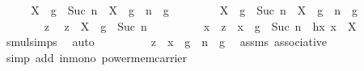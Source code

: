 \begin{isabellebody}
\ \ \isamarkupfalse%
\ \isamarkupfalse%
\ {\isachardoublequoteopen}X\ {\isasymcdots}\ {\isacharbraceleft}{\kern0pt}g\ {\isacharcircum}{\kern0pt}\ Suc\ n{\isacharbraceright}{\kern0pt}\ {\isacharequal}{\kern0pt}\ {\isacharparenleft}{\kern0pt}X\ {\isasymcdots}\ {\isacharbraceleft}{\kern0pt}g\ {\isacharcircum}{\kern0pt}\ n{\isacharbraceright}{\kern0pt}{\isacharparenright}{\kern0pt}\ {\isasymcdots}\ {\isacharbraceleft}{\kern0pt}g{\isacharbraceright}{\kern0pt}{\isachardoublequoteclose}\isanewline
\ \ \isamarkupfalse%
\isanewline
\ \ \ \ \isamarkupfalse%
\ {\isachardoublequoteopen}X\ {\isasymcdots}\ {\isacharbraceleft}{\kern0pt}g\ {\isacharcircum}{\kern0pt}\ Suc\ n{\isacharbraceright}{\kern0pt}\ {\isasymsubseteq}\ {\isacharparenleft}{\kern0pt}X\ {\isasymcdots}\ {\isacharbraceleft}{\kern0pt}g\ {\isacharcircum}{\kern0pt}\ n{\isacharbraceright}{\kern0pt}{\isacharparenright}{\kern0pt}\ {\isasymcdots}\ {\isacharbraceleft}{\kern0pt}g{\isacharbraceright}{\kern0pt}{\isachardoublequoteclose}\isanewline
\ \ \ \ \isamarkupfalse%
\isanewline
\ \ \ \ \ \ \isamarkupfalse%
\ z\ \isamarkupfalse%
\ {\isachardoublequoteopen}z\ {\isasymin}\ X\ {\isasymcdots}\ {\isacharbraceleft}{\kern0pt}g\ {\isacharcircum}{\kern0pt}\ Suc\ n{\isacharbraceright}{\kern0pt}{\isachardoublequoteclose}\isanewline
\ \ \ \ \ \ \isamarkupfalse%
\ \isamarkupfalse%
\ x\ \ {\isachardoublequoteopen}z\ {\isacharequal}{\kern0pt}\ x\ {\isasymcdot}\ {\isacharparenleft}{\kern0pt}g\ {\isacharcircum}{\kern0pt}\ Suc\ n{\isacharparenright}{\kern0pt}{\isachardoublequoteclose}\ \ hx{\isacharcolon}{\kern0pt}\ {\isachardoublequoteopen}x\ {\isasymin}\ X{\isachardoublequoteclose}\ \ \isamarkupfalse%
\ smul{\isachardot}{\kern0pt}simps\ \isamarkupfalse%
\ auto\isanewline
\ \ \ \ \ \ \isamarkupfalse%
\ \isamarkupfalse%
\ {\isachardoublequoteopen}z\ {\isacharequal}{\kern0pt}\ {\isacharparenleft}{\kern0pt}x\ {\isasymcdot}\ g\ {\isacharcircum}{\kern0pt}\ n{\isacharparenright}{\kern0pt}\ {\isasymcdot}\ g{\isachardoublequoteclose}\ \isamarkupfalse%
\ assms\ associative\ \isamarkupfalse%
\ {\isacharparenleft}{\kern0pt}simp\ add{\isacharcolon}{\kern0pt}\ in{\isacharunderscore}{\kern0pt}mono\ power{\isacharunderscore}{\kern0pt}mem{\isacharunderscore}{\kern0pt}carrier{\isacharparenright}{\kern0pt}\ \isanewline
\ \ \ \ \ \ \isamarkupfalse%

\end{isabellebody}
